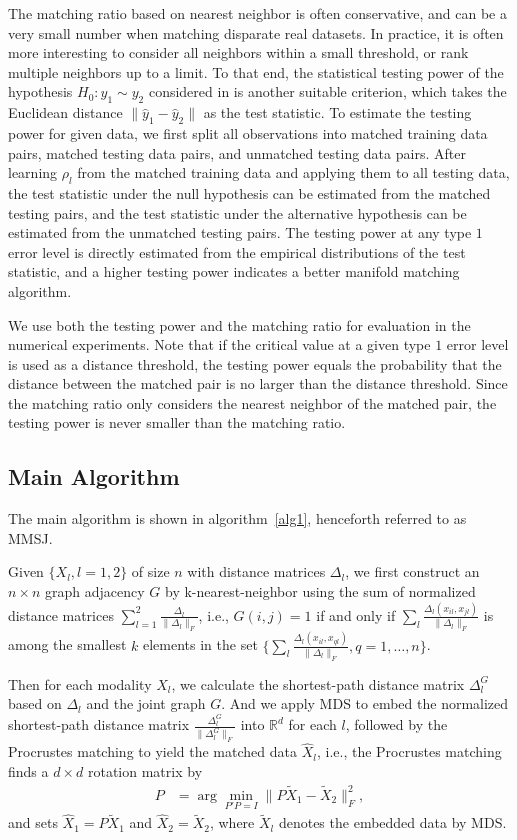 \documentclass[times,twocolumn,final]{elsarticle}
\begin{document}
The matching ratio based on nearest neighbor is often conservative, and can be a very small number when matching disparate real datasets. In practice, it is often more interesting to consider all neighbors within a small threshold, or rank multiple neighbors up to a limit. To that end, the statistical testing power of the hypothesis $H_{0}: y_{1} \sim y_{2}$ considered in \citep{PriebeMarchette2012} is another suitable criterion, which takes the Euclidean distance $\|\hat{y}_{1}- \hat{y}_{2}\|$ as the test statistic. To estimate the testing power for given data, we first split all observations into matched training data pairs, matched testing data pairs, and unmatched testing data pairs. After learning $\rho_{l}$ from the matched training data and applying them to all testing data, the test statistic under the null hypothesis can be estimated from the matched testing pairs, and the test statistic under the alternative hypothesis can be estimated from the unmatched testing pairs. The testing power at any type $1$ error level is directly estimated from the empirical distributions of the test statistic, and a higher testing power indicates a better manifold matching algorithm. 

We use both the testing power and the matching ratio for evaluation in the numerical experiments. Note that if the critical value at a given type $1$ error level is used as a distance threshold, the testing power equals the probability that the distance between the matched pair is no larger than the distance threshold. Since the matching ratio only considers the nearest neighbor of the matched pair, the testing power is never smaller than the matching ratio.

\subsection{Main Algorithm}
\label{main1}
The main algorithm is shown in algorithm~\ref{alg1}, henceforth referred to as MMSJ. 

Given $\{X_{l}, l=1,2\}$ of size $n$ with distance matrices $\Delta_{l}$, we first construct an $n \times n$ graph adjacency $G$ by k-nearest-neighbor using the sum of normalized distance matrices $\sum_{l=1}^{2} \frac{\Delta_{l}}{\|\Delta_{l}\|_{F}}$, i.e., $G(i,j)=1$ if and only if $\sum_{l} \frac{\Delta_{l}(x_{il},x_{jl})}{\|\Delta_{l}\|_{F}}$ is among the smallest $k$ elements in the set $\{ \sum_{l} \frac{\Delta_{l}(x_{il},x_{ql})} {\|\Delta_{l}\|_{F}}, q=1,\ldots,n \}$.

Then for each modality $X_{l}$, we calculate the shortest-path distance matrix $\Delta_{l}^{G}$ based on $\Delta_{l}$ and the joint graph $G$. And we apply MDS to 
embed the normalized shortest-path distance matrix $\frac{\Delta_{l}^{G}}{\|\Delta_{l}^{G}\|_{F}}$ into $\mathbb{R}^{d}$ for each $l$, followed by the Procrustes matching to yield the matched data $\hat{X}_{l}$, i.e., the Procrustes matching finds a $d \times d$ rotation matrix by
\begin{align*}
P&=\arg\min_{P'P=I} \|P \tilde{X}_{1}-\tilde{X}_{2}\|_{F}^{2},
\end{align*}
and sets $\hat{X}_{1}=P \tilde{X}_{1}$ and $\hat{X}_{2}=\tilde{X}_{2}$, where $\tilde{X}_{l}$ denotes the embedded data by MDS.
\end{document}
